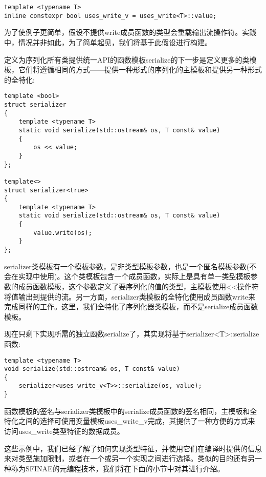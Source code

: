 \begin{lstlisting}[style=styleCXX]
template <typename T>
inline constexpr bool uses_write_v = uses_write<T>::value;
\end{lstlisting}

为了使例子更简单，假设不提供write成员函数的类型会重载输出流操作符。实践中，情况并非如此，为了简单起见，我们将基于此假设进行构建。

定义为序列化所有类提供统一API的函数模板serialize的下一步是定义更多的类模板，它们将遵循相同的方式——提供一种形式的序列化的主模板和提供另一种形式的全特化:

\begin{lstlisting}[style=styleCXX]
template <bool>
struct serializer
{
	template <typename T>
	static void serialize(std::ostream& os, T const& value)
	{
		os << value;
	}
};

template<>
struct serializer<true>
{
	template <typename T>
	static void serialize(std::ostream& os, T const& value)
	{
		value.write(os);
	}
};
\end{lstlisting}

serializer类模板有一个模板参数，是非类型模板参数，也是一个匿名模板参数(不会在实现中使用)。这个类模板包含一个成员函数，实际上是具有单一类型模板参数的成员函数模板，这个参数定义了要序列化的值的类型，主模板使用<{}<操作符将值输出到提供的流。另一方面，serializer类模板的全特化使用成员函数write来完成同样的工作。这里，我们全特化了序列化器类模板，而不是serialize成员函数模板。

现在只剩下实现所需的独立函数serialize了，其实现将基于serializer<T>::serialize函数:

\begin{lstlisting}[style=styleCXX]
template <typename T>
void serialize(std::ostream& os, T const& value)
{
	serializer<uses_write_v<T>>::serialize(os, value);
}
\end{lstlisting}

函数模板的签名与serializer类模板中的serialize成员函数的签名相同，主模板和全特化之间的选择可使用变量模板uses\_write\_v完成，其提供了一种方便的方式来访问uses\_write类型特征的数据成员。

这些示例中，我们已经了解了如何实现类型特征，并使用它们在编译时提供的信息来对类型施加限制，或者在一个或另一个实现之间进行选择。类似的目的还有另一种称为SFINAE的元编程技术，我们将在下面的小节中对其进行介绍。


























